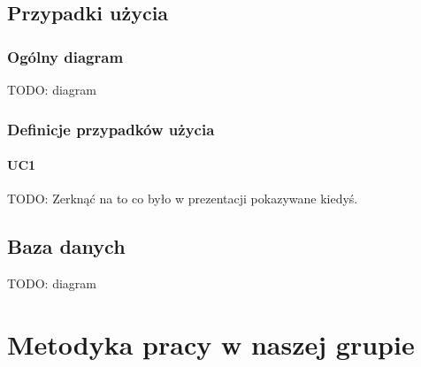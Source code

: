 \documentclass[pdflatex,11pt]{aghdpl}
\begin{document}
\section{Przypadki użycia}

\subsection{Ogólny diagram}

TODO: diagram


\subsection{Definicje przypadków użycia}

\subsubsection*{UC1}

TODO: Zerknąć na to co było w prezentacji pokazywane kiedyś.


\section{Baza danych}

TODO: diagram




\chapter{Metodyka pracy w naszej grupie}
\end{document}
